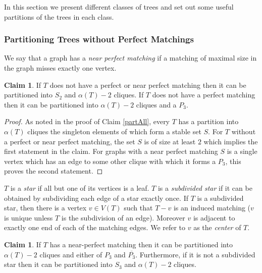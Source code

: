 \documentclass[12pt]{article}
\theoremstyle{definition}
\newtheorem{claim}[theorem]{Claim}
\begin{document}
In this section we present different classes of trees and set out some useful partitions of  the trees in each class.  
 



\subsubsection{Partitioning Trees without Perfect Matchings}

We say that a graph has a {\it near perfect matching} if a matching of maximal size in the graph misses exactly one vertex. 

\begin{claim}\label{oldC} \label{oldB}
If $T$ does not have a perfect or near perfect matching then it can be partitioned into $S_2$ and $\alpha(T)-2$ cliques. 
If $T$ does not have a perfect matching then it can be partitioned into $\alpha(T)-2$ cliques and a  $P_3$.
\end{claim}

\begin{proof}
As noted in the proof of Claim \ref{partAll}, every  $T$ has a partition into $\alpha(T)$ cliques the singleton elements of which form a stable set $S$. For  $T$ without a perfect or near perfect matching, the set $S$ is of size at least $2$ which implies the  first statement in the claim. For graphs with a near perfect matching $S$ is a single vertex which has an edge to some other clique with which it forms a $P_3$, this proves the second statement. 
\end{proof}




$T$ is a {\it star} if all but one of its vertices is a leaf. $T$  is a {\it subdivided star} if it can be obtained by subdividing each edge of a star exactly once. If $T$ is a subdivided star, then there is a  vertex $v\in V(T)$ such that $T-v$ is an induced matching ($v$ is unique unless $T$ is the subdivision of an edge). Moreover $v$ is adjacent to exactly one end of each of the matching edges. We refer to $v$ as the \textit{center} of $T$.

\begin{claim}\label{oldD}
If $T$ has a near-perfect matching then it can be partitioned into  $\alpha(T)-2$ cliques and either of $P_3$ and $\overline{P_3}$. 
Furthermore, if it is not a subdivided star then it can be partitioned into $S_3$ and $\alpha(T)-2$ cliques. 
\end{claim}
\end{document}
